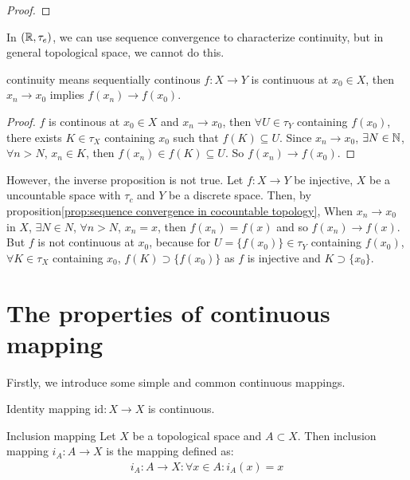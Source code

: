 \begin{proof}
    
\end{proof}

In $(\mathbb{R},\tau_e)$, we can use sequence convergence to characterize continuity, 
but in general topological space, we cannot do this.
\begin{proposition}{}{continuity means sequentially continous}
    $f:X\rightarrow Y$ is continuous at $x_0\in X$, then $x_n\rightarrow x_0$ implies $f(x_n)\rightarrow f(x_0)$.
\end{proposition}
\begin{proof}
    $f$ is continous at $x_0\in X$ and $x_n\rightarrow x_0$, 
    then $\forall U\in\tau_Y$ containing $f(x_0)$, 
    there exists $K\in\tau_X$ containing $x_0$ such that $f(K)\subseteq U$.
    Since $x_n\rightarrow x_0$, $\exists N\in\mathbb{N}$, $\forall n>N$, $x_n\in K$, then $f(x_n)\in f(K)\subseteq U$.
    So $f(x_n)\rightarrow f(x_0)$.
\end{proof}
However, the inverse proposition is not true. 
Let $f:X\rightarrow Y$ be injective, $X$ be a uncountable space with $\tau_c$ and $Y$ be a discrete space.
Then, by proposition\ref{prop:sequence convergence in cocountable topology}, 
When $x_n\rightarrow x_0$ in $X$, $\exists N\in N$, $\forall n>N$, $x_n=x$, 
then $f(x_n)=f(x)$ and so $f(x_n)\rightarrow f(x)$.
But $f$ is not continuous at $x_0$, because for $U=\{f(x_0)\}\in \tau_Y$ containing $f(x_0)$, 
$\forall K\in \tau_X$ containing $x_0$, $f(K)\supset \{f(x_0)\}$ as $f$ is injective and $K\supset \{x_0\}$.


\section{The properties of continuous mapping}

Firstly, we introduce some simple and common continuous mappings.
\begin{proposition}{}{}
    Identity mapping $\text{id}:X\rightarrow X$ is continuous.
\end{proposition}

\begin{definition}{}{Inclusion mapping}
        Let $X$ be a topological space and $A\subset X$. 
        Then inclusion mapping $i_A:A\rightarrow X$ is the mapping defined as:
        \begin{align*}
            i_A:A\rightarrow X: \forall x\in A:i_{A}(x)=x
        \end{align*}
\end{definition}

